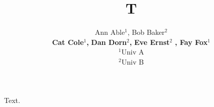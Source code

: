 \documentclass{article}
\title{T}
\author{Ann Able$^1$, Bob Baker$^2$\\ \textbf{Cat Cole$^1$,} \textbf{Dan Dorn}$^2$\textbf{,} \textbf{Eve Ernst}$^2$ \textbf{, Fay Fox}$^1$\\ $^1$Univ A\\ $^2$Univ B}
\begin{document}
\maketitle
Text.
\end{document}
